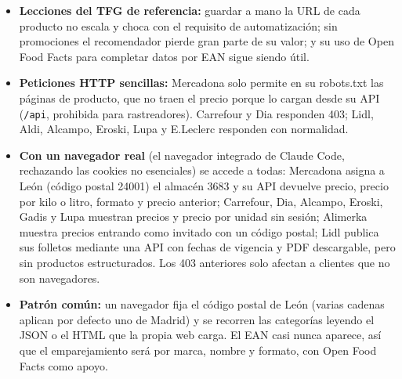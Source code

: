 \begin{tcolorbox}[colback=responsecolor, title=Insights de Claude, colframe=gray!60!black, breakable]
	\begin{itemize}
		\item \textbf{Lecciones del TFG de referencia:} guardar a mano la URL de cada producto no escala y choca con el requisito de automatización; sin promociones el recomendador pierde gran parte de su valor; y su uso de Open Food Facts para completar datos por EAN sigue siendo útil.

		\item \textbf{Peticiones HTTP sencillas:} Mercadona solo permite en su robots.txt las páginas de producto, que no traen el precio porque lo cargan desde su API (\texttt{/api}, prohibida para rastreadores). Carrefour y Dia responden 403; Lidl, Aldi, Alcampo, Eroski, Lupa y E.Leclerc responden con normalidad.

		\item \textbf{Con un navegador real} (el navegador integrado de Claude Code, rechazando las cookies no esenciales) se accede a todas: Mercadona asigna a León (código postal 24001) el almacén 3683 y su API devuelve precio, precio por kilo o litro, formato y precio anterior; Carrefour, Dia, Alcampo, Eroski, Gadis y Lupa muestran precios y precio por unidad sin sesión; Alimerka muestra precios entrando como invitado con un código postal; Lidl publica sus folletos mediante una API con fechas de vigencia y PDF descargable, pero sin productos estructurados. Los 403 anteriores solo afectan a clientes que no son navegadores.

		\item \textbf{Patrón común:} un navegador fija el código postal de León (varias cadenas aplican por defecto uno de Madrid) y se recorren las categorías leyendo el JSON o el HTML que la propia web carga. El EAN casi nunca aparece, así que el emparejamiento será por marca, nombre y formato, con Open Food Facts como apoyo.
	\end{itemize}
\end{tcolorbox}

